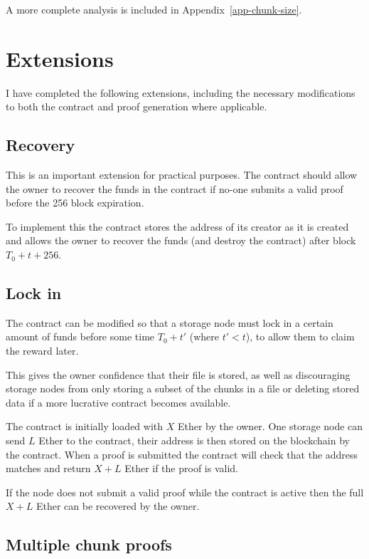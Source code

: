 \documentclass[12pt,a4paper,twoside,openright]{report}
\begin{document}
A more complete analysis is included in Appendix~\ref{app-chunk-size}.

\section{Extensions}


I have completed the following extensions, including the necessary modifications to both the contract and proof generation where applicable.


\subsection{Recovery}

This is an important extension for practical purposes.
The contract should allow the owner to recover the funds in the contract if no-one submits a valid proof before the 256 block expiration.

To implement this the contract stores the address of its creator as it is created
and allows the owner to recover the funds (and destroy the contract) after block $T_0 + t + 256$.

\subsection{Lock in} \label{ext-lockin}

The contract can be modified so that a storage node must lock in a certain amount of funds before some time $T_0 + t'$ (where $t' < t$),
to allow them to claim the reward later.

This gives the owner confidence that their file is stored, as well as discouraging storage nodes from only storing a subset of the chunks in a file
or deleting stored data if a more lucrative contract becomes available.

The contract is initially loaded with $X$ Ether by the owner.
One storage node can send $L$ Ether to the contract, their address is then stored on the blockchain by the contract.
When a proof is submitted the contract will check that the address matches and return $X + L$ Ether
if the proof is valid.

If the node does not submit a valid proof while the contract is active then the full $X + L$ Ether can be recovered by the owner.

\subsection{Multiple chunk proofs} \label{multi-chunk}
\end{document}
